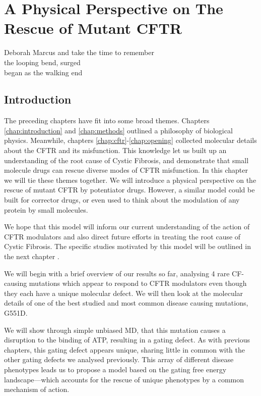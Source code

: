 \chapter{A Physical Perspective on The Rescue of Mutant CFTR}
\label{chap:perspective}

\begin{chapquote}{Deborah Marcus \cite{marcus_ouroboros}}
and take the time to remember\\
the looping bend, surged\\
began as the walking end
\end{chapquote}

\section{Introduction}

The preceding chapters have fit into some broad themes. Chapters \ref{chap:introduction} and \ref{chap:methods} outlined a philosophy of biological physics. Meanwhile, chapters \ref{chap:cftr}-\ref{chap:opening} collected molecular details about the CFTR and its misfunction. This knowledge let us built up an understanding of the root cause of Cystic Fibrosis, and demonstrate that small molecule drugs can rescue diverse modes of CFTR misfunction. In this chapter we will tie these themes together. We will introduce a physical perspective on the rescue of mutant CFTR by potentiator drugs. However, a similar model could be built for corrector drugs, or even used to think about the modulation of any protein by small molecules.

We hope that this model will inform our current understanding of the action of CFTR modulators and also direct future efforts in treating the root cause of Cystic Fibrosis. The specific studies motivated by this model will be outlined in the next chapter .

We will begin with a brief overview of our results so far, analysing 4 rare CF-causing mutations which appear to respond to CFTR modulators even though they each have a unique molecular defect. We will then look at the molecular details of one of the best studied and most common disease causing mutations, G551D.


We will show through simple unbiased MD, that this mutation causes a disruption to the binding of ATP, resulting in a gating defect. As with previous chapters, this gating defect appears unique, sharing little in common with the other gating defects we analysed previously. This array of different disease phenotypes leads us to propose a model based on the gating free energy landscape---which accounts for the rescue of unique phenotypes by a common mechanism of action. 

